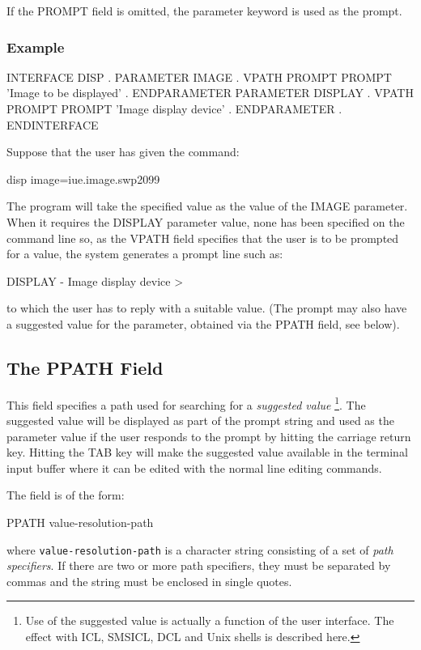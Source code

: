 \documentclass[twoside,11pt,nolof]{starlink}
\begin{document}
If the PROMPT field is omitted, the parameter keyword is used as the prompt.

\subsubsection*{Example}
\begin{terminalv}
INTERFACE DISP
   .
   PARAMETER IMAGE
         .
      VPATH PROMPT
      PROMPT 'Image to be displayed'
         .
   ENDPARAMETER
   PARAMETER DISPLAY
         .
      VPATH PROMPT
      PROMPT 'Image display device'
         .
   ENDPARAMETER
      .
ENDINTERFACE
\end{terminalv}
Suppose that the user has given the command:
\begin{terminalv}
disp image=iue.image.swp2099
\end{terminalv}
The program will take the specified value as the value of the IMAGE parameter.
When it requires the DISPLAY parameter value, none has been specified on
the command line so, as the VPATH field specifies that the user is
to be prompted for a value, the system generates a prompt line such
as:
\begin{terminalv}
DISPLAY - Image display device >
\end{terminalv}
to which the user has to reply with a suitable value. (The prompt may
also have a suggested value for the parameter, obtained via the PPATH
field, see below).

\subsection{The PPATH Field
\label{ppath}}

This field specifies a path used for searching for a \emph{suggested value}
\footnote{Use of the suggested value is actually a function of the user
interface.
The effect with ICL, SMSICL, DCL and Unix shells is described here.}.
The suggested value will be displayed as part of the prompt string and used as
the parameter value if the user responds to the prompt by hitting the carriage
return key.
Hitting the TAB key will make the suggested value available in the
terminal input buffer where it can be edited with the normal line editing
commands.

The field is of the form:
\begin{terminalv}
PPATH  value-resolution-path
\end{terminalv}
where \texttt{value-resolution-path} is a character string
consisting of a set of \emph{path specifiers}. If there are two or more
path specifiers, they must be separated by commas and the string must be
enclosed in single quotes.
\end{document}
